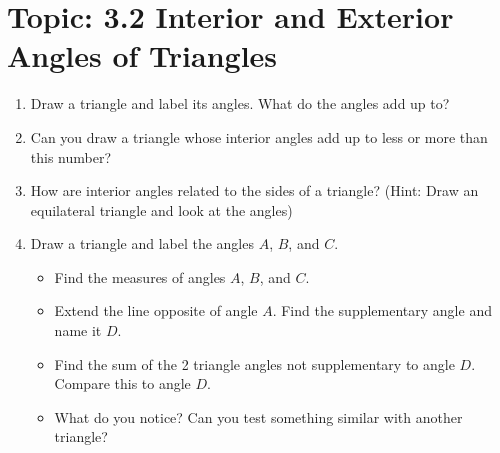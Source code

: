 \documentclass[12pt,letterpaper]{article}
\begin{document}
\section*{Topic: 3.2 Interior and Exterior Angles of Triangles}
\begin{enumerate}[label=\arabic*.]
    \item Draw a triangle and label its angles. What do the angles add up to?
    \item Can you draw a triangle whose interior angles add up to less or more than this number?
    \item How are interior angles related to the sides of a triangle? (Hint: Draw an equilateral triangle and look at the angles)
    \item Draw a triangle and label the angles $A$, $B$, and $C$.
          \begin{itemize}
              \item Find the measures of angles $A$, $B$, and $C$.
              \item Extend the line opposite of angle $A$. Find the supplementary angle and name it $D$.
              \item Find the sum of the 2 triangle angles not supplementary to angle $D$. Compare this to angle $D$.
              \item What do you notice? Can you test something similar with another triangle?
          \end{itemize}
\end{enumerate}
\end{document}
